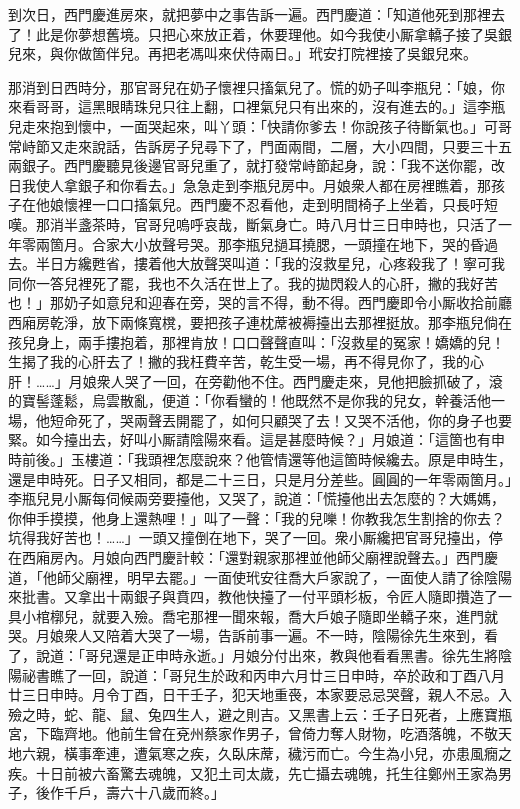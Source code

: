 到次日，西門慶進房來，就把夢中之事告訴一遍。西門慶道：「知道他死到那裡去了！此是你夢想舊境。只把心來放正着，休要理他。如今我使小厮拿轎子接了吳銀兒來，與你做箇伴兒。再把老馮叫來伏侍兩日。」玳安打院裡接了吳銀兒來。

那消到日西時分，那官哥兒在奶子懷裡只搐氣兒了。慌的奶子叫李瓶兒：「娘，你來看哥哥，這黑眼睛珠兒只往上翻，口裡氣兒只有出來的，沒有進去的。」這李瓶兒走來抱到懷中，一面哭起來，叫丫頭：「快請你爹去！你說孩子待斷氣也。」可哥常峙節又走來說話，{}告訴房子兒尋下了，門面兩間，二層，大小四間，只要三十五兩銀子。西門慶聽見後邊官哥兒重了，就打發常峙節起身，說：「我不送你罷，改日我使人拿銀子和你看去。」急急走到李瓶兒房中。月娘衆人都在房裡瞧着，那孩子在他娘懷裡一口口搐氣兒。{}西門慶不忍看他，走到明間椅子上坐着，只長吁短嘆。那消半盞茶時，官哥兒嗚呼哀哉，斷氣身亡。時八月廿三日申時也，只活了一年零兩箇月。合家大小放聲号哭。那李瓶兒撾耳撓腮，一頭撞在地下，哭的昏過去。半日方纔甦省，摟着他大放聲哭叫道：「我的沒救星兒，心疼殺我了！寧可我同你一答兒裡死了罷，我也不久活在世上了。我的拋閃殺人的心肝，撇的我好苦也！」那奶子如意兒和迎春在旁，哭的言不得，動不得。西門慶即令小厮收拾前廳西廂房乾淨，放下兩條寬櫈，要把孩子連枕蓆被褥擡出去那裡挺放。那李瓶兒倘在孩兒身上，兩手摟抱着，那裡肯放！口口聲聲直叫：「沒救星的冤家！嬌嬌的兒！生揭了我的心肝去了！撇的我枉費辛苦，乾生受一場，再不得見你了，我的心肝！……」月娘衆人哭了一回，在旁勸他不住。西門慶走來，見他把臉抓破了，滾的寶髻蓬鬆，烏雲散亂，便道：「你看蠻的！他既然不是你我的兒女，幹養活他一場，他短命死了，哭兩聲丟開罷了，{}如何只顧哭了去！又哭不活他，你的身子也要緊。如今擡出去，好叫小厮請陰陽來看。這是甚麼時候？」月娘道：「這箇也有申時前後。」玉樓道：「我頭裡怎麼說來？他管情還等他這箇時候纔去。原是申時生，還是申時死。日子又相同，都是二十三日，只是月分差些。圓圓的一年零兩箇月。」李瓶兒見小厮每伺候兩旁要擡他，又哭了，說道：「慌擡他出去怎麼的？大媽媽，你伸手摸摸，他身上還熱哩！」{}叫了一聲：「我的兒嚛！你教我怎生割捨的你去？坑得我好苦也！……」一頭又撞倒在地下，哭了一回。衆小厮纔把官哥兒擡出，停在西廂房內。月娘向西門慶計較：「還對親家那裡並他師父廟裡說聲去。」西門慶道，「他師父廟裡，明早去罷。」一面使玳安往喬大戶家說了，一面使人請了徐陰陽來批書。又拿出十兩銀子與賁四，教他快擡了一付平頭杉板，令匠人隨即攢造了一具小棺槨兒，就要入殮。喬宅那裡一聞來報，喬大戶娘子隨即坐轎子來，進門就哭。月娘衆人又陪着大哭了一場，告訴前事一遍。不一時，陰陽徐先生來到，看了，說道：「哥兒還是正申時永逝。」月娘分付出來，教與他看看黑書。徐先生將陰陽祕書瞧了一回，說道：「哥兒生於政和丙申六月廿三日申時，卒於政和丁酉八月廿三日申時。月令丁酉，日干壬子，犯天地重䘮，本家要忌忌哭聲，親人不忌。入殮之時，蛇、龍、鼠、兔四生人，避之則吉。又黑書上云：壬子日死者，上應寶瓶宮，下臨齊地。他前生曾在兗州蔡家作男子，曾倚力奪人財物，吃酒落魄，不敬天地六親，橫事牽連，遭氣寒之疾，久臥床蓆，穢污而亡。今生為小兒，亦患風癇之疾。十日前被六畜驚去魂魄，又犯土司太歲，先亡攝去魂魄，托生往鄭州王家為男子，後作千戶，壽六十八歲而終。」

